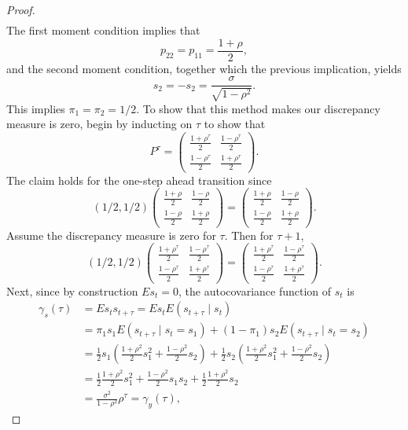 \documentclass[oneside,reqno]{amsart}
\theoremstyle{definition}
\begin{document}
\begin{enumerate}[label=(\roman*)]
\begin{proof}
\begin{align*}
\end{align*}
The first moment condition implies that 
\[
	p_{22} = p_{11} = \frac{1+\rho}{2},
\]
and the second moment condition, together which the previous implication, yields 
\[
	s_2 = -s_2 = \frac{\sigma}{\sqrt{1-\rho^2}}.
\]
This implies $\pi_1 = \pi_2 = 1/2$. To show that this method makes our discrepancy measure is zero, begin by inducting on $\tau$ to show that
\[
	P^\tau = \begin{pmatrix}
		\frac{1+\rho^\tau}{2} & \frac{1- \rho^\tau}{2} \\
		\frac{1-\rho^\tau}{2} & \frac{1+ \rho^\tau}{2}
	\end{pmatrix}.
\] 
The claim holds for the one-step ahead transition since
\[
	(1/2, 1/2)
	\begin{pmatrix}
		\frac{1+\rho}{2} & \frac{1- \rho}{2} \\
		\frac{1-\rho}{2} & \frac{1+ \rho}{2}
	\end{pmatrix}
	=\begin{pmatrix}
		\frac{1+\rho}{2} & \frac{1- \rho}{2} \\
		\frac{1-\rho}{2} & \frac{1+ \rho}{2}
	\end{pmatrix}.
\]
Assume the discrepancy measure is zero for $\tau$. Then for $\tau+1$,
\[
	(1/2, 1/2)
	\begin{pmatrix}
		\frac{1+\rho^\tau}{2} & \frac{1- \rho^\tau}{2} \\
		\frac{1-\rho^\tau}{2} & \frac{1+ \rho^\tau}{2}
	\end{pmatrix}
	=\begin{pmatrix}
		\frac{1+\rho^\tau}{2} & \frac{1- \rho^\tau}{2} \\
		\frac{1-\rho^\tau}{2} & \frac{1+ \rho^\tau}{2}
	\end{pmatrix}.
\]
Next, since by construction $E s_t = 0$, the autocovariance function of $s_t$ is 
\begin{align*}
	\gamma_s(\tau) &= E s_ts_{t+\tau} = E s_t E (s_{t+\tau} \mid s_t) \\
		&= \pi_1 s_1 E (s_{t+\tau} \mid s_t = s_1) +  (1-\pi_1) s_2 E (s_{t+\tau} \mid s_t = s_2) \\
		&= \frac{1}{2} s_1 \left(\frac{1+\rho^2}{2} s_1^2 + \frac{1-\rho^2}{2} s_2\right) + \frac{1}{2} s_2 \left(\frac{1+\rho^2}{2} s_1^2 + \frac{1-\rho^2}{2} s_2 \right) \\
		&= \frac{1}{2} \frac{1+\rho^2}{2} s_1^2 + \frac{1-\rho^2}{2} s_1s_2 + \frac{1}{2} \frac{1+\rho^2}{2} s_2 \\
		&= \frac{\sigma^2}{1-\rho^2}\rho^\tau = \gamma_y(\tau),

\end{align*}
\end{proof}
\end{enumerate}
\end{document}
